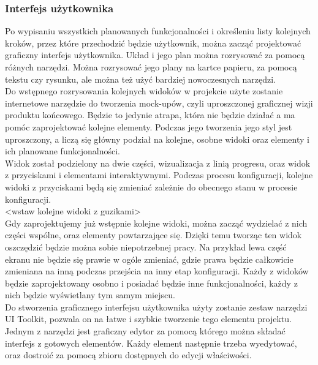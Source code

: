 \documentclass{article} %
\begin{document}
        \subsubsection{Interfejs użytkownika}
            Po wypisaniu wszystkich planowanych funkcjonalności i określeniu listy kolejnych kroków, przez które przechodzić będzie użytkownik, można zacząć projektować graficzny interfejs użytkownika. Układ i jego plan można rozrysować za pomocą różnych narzędzi. Można rozrysować jego plany na kartce papieru, za pomocą tekstu czy rysunku, ale można też użyć bardziej nowoczesnych narzędzi.
            \\
            
            Do wstępnego rozrysowania kolejnych widoków w projekcie użyte zostanie internetowe narzędzie do tworzenia mock-upów, czyli uproszczonej graficznej wizji produktu końcowego. Będzie to jedynie atrapa, która nie będzie działać a ma pomóc zaprojektować kolejne elementy. Podczas jego tworzenia jego styl jest uproszczony, a liczą się główny podział na kolejne, osobne widoki oraz elementy i ich planowane funkcjonalności.
            \\
            
            Widok został podzielony na dwie części, wizualizacja z linią progresu, oraz widok z przyciskami i elementami interaktywnymi. Podczas procesu konfiguracji, kolejne widoki z przyciskami będą się zmieniać zależnie do obecnego stanu w procesie konfiguracji. 
            \\
            
            <wstaw kolejne widoki z guzikami>
            \\
            
            Gdy zaprojektujemy już wstępnie kolejne widoki, można zacząć wydzielać z nich części wspólne, oraz elementy powtarzające się. Dzięki temu tworząc ten widok oszczędzić będzie można sobie niepotrzebnej pracy. Na przykład lewa część ekranu nie będzie się prawie w ogóle zmieniać, gdzie prawa będzie całkowicie zmieniana na inną podczas przejścia na inny etap konfiguracji. Każdy z widoków będzie zaprojektowany osobno i posiadać będzie inne funkcjonalności, każdy z nich będzie wyświetlany tym samym miejscu. 
            \\
            
            Do stworzenia graficznego interfejsu użytkownika użyty zostanie zestaw narzędzi UI Toolkit, pozwala on na łatwe i szybkie tworzenie tego elementu projektu. Jednym z narzędzi jest graficzny edytor za pomocą którego można składać interfejs z gotowych elementów. Każdy element następnie trzeba wyedytować, oraz dostroić za pomocą zbioru dostępnych do edycji właściwości.
            \\
            
\end{document}
